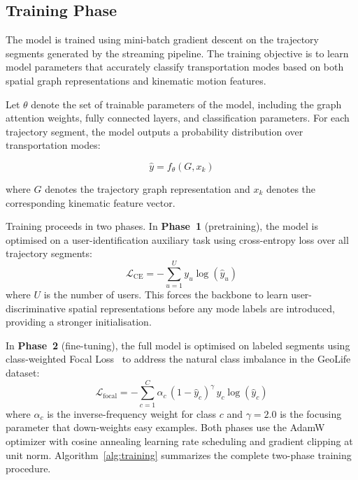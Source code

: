 \documentclass[conference]{IEEEtran}
\begin{document}
\subsection{Training Phase}
The model is trained using mini-batch gradient descent on the trajectory segments generated by the streaming pipeline. The training objective is to learn model parameters that accurately classify transportation modes based on both spatial graph representations and kinematic motion features.

Let $\theta$ denote the set of trainable parameters of the model, including the graph attention weights, fully connected layers, and classification parameters. For each trajectory segment, the model outputs a probability distribution over transportation modes:

\begin{equation}
\hat{y} = f_\theta(G, x_k)
\end{equation}

where $G$ denotes the trajectory graph representation and $x_k$ denotes the corresponding kinematic feature vector.

Training proceeds in two phases. In \textbf{Phase~1} (pretraining), the model is optimised on a user-identification auxiliary task using cross-entropy loss over all trajectory segments:
\begin{equation}
\mathcal{L}_{\text{CE}} = - \sum_{u=1}^{U} y_u \log(\hat{y}_u)
\end{equation}
where $U$ is the number of users. This forces the backbone to learn user-discriminative spatial representations before any mode labels are introduced, providing a stronger initialisation.

In \textbf{Phase~2} (fine-tuning), the full model is optimised on labeled segments using class-weighted Focal Loss~\cite{lin2017focal} to address the natural class imbalance in the GeoLife dataset:
\begin{equation}
\mathcal{L}_{\text{focal}} = -\sum_{c=1}^{C} \alpha_c \,(1 - \hat{y}_c)^{\gamma}\, y_c \log(\hat{y}_c)
\end{equation}
where $\alpha_c$ is the inverse-frequency weight for class $c$ and $\gamma = 2.0$ is the focusing parameter that down-weights easy examples. Both phases use the AdamW optimizer with cosine annealing learning rate scheduling and gradient clipping at unit norm. Algorithm~\ref{alg:training} summarizes the complete two-phase training procedure.
\end{document}
